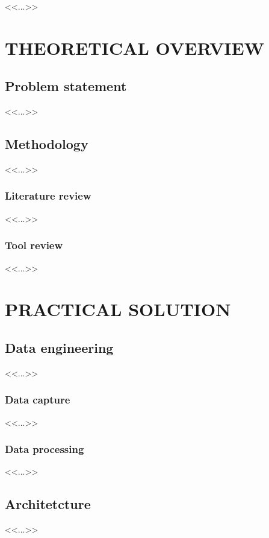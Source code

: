 \documentclass[a4paper,12pt]{extarticle}
\begin{document}
    
    \pagebreak

    
    \pagebreak

    \tableofcontents{}
    \pagebreak

    <<...>>

    \newpage
    \section{THEORETICAL OVERVIEW}
    \subsection{Problem statement}
    <<...>>

    \subsection{Methodology}
    <<...>>

    \subsubsection{Literature review}
    <<...>>

    \subsubsection{Tool review}
    <<...>>

    \newpage
    \section{PRACTICAL SOLUTION}
    \subsection{Data engineering}
    <<...>>

    \subsubsection{Data capture}
    <<...>>

    \subsubsection{Data processing}
    <<...>>

    \subsection{Architetcture}
    <<...>>
\end{document}
